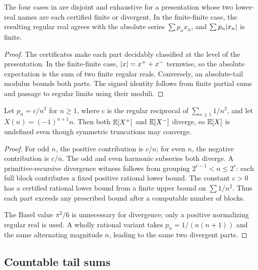 \begin{proposition}
\label{prop:parts-classification}
The four cases in  are disjoint and exhaustive for a
presentation whose two lower-real names are each certified finite or divergent.
In the finite-finite case, the resulting regular real agrees with the absolute
series \(\sum p_nx_n\), and \(\sum p_n\lvert x_n\rvert\) is finite.
\end{proposition}

\begin{proof}
The certificates make each part decidably classified at the level of the
presentation.  In the finite-finite case,
\(\lvert x\rvert=x^++x^-\) termwise, so the absolute expectation is the sum of two
finite regular reals.  Conversely, an absolute-tail modulus bounds both parts.
The signed identity follows from finite partial sums and passage to regular
limits using their moduli.
\end{proof}

\begin{proposition}
\label{prop:undefined-alt}
Let \(p_n=c/n^2\) for \(n\ge1\), where \(c\) is the regular reciprocal of
\(\sum_{n\ge1}1/n^2\), and let \(X(n)=(-1)^{n+1}n\).  Then both
\(\mathbb E[X^+]\) and \(\mathbb E[X^-]\) diverge, so \(\mathbb E[X]\) is undefined even though
symmetric truncations may converge.
\end{proposition}

\begin{proof}
For odd \(n\), the positive contribution is \(c/n\); for even \(n\), the
negative contribution is \(c/n\).  The odd and even harmonic subseries both
diverge.  A primitive-recursive divergence witness follows from grouping
\(2^{r-1}<n\le2^r\): each full block contributes a fixed positive rational
lower bound.  The constant \(c>0\) has a certified rational lower bound from a
finite upper bound on \(\sum1/n^2\).  Thus each part exceeds any prescribed
bound after a computable number of blocks.

The Basel value \(\pi^2/6\) is unnecessary for divergence; only a positive
normalizing regular real is used.  A wholly rational variant takes
\(p_n=1/(n(n+1))\) and the same alternating magnitude \(n\), leading to the
same two divergent parts.
\end{proof}

\subsection{Countable tail sums}

